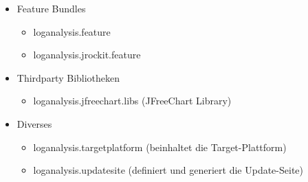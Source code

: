 \begin{itemize}
	\item Feature Bundles
		\begin{itemize}
			\item loganalysis.feature
			\item loganalysis.jrockit.feature
		\end{itemize}
	\item Thirdparty Bibliotheken
		\begin{itemize}
			\item  loganalysis.jfreechart.libs (JFreeChart Library)
		\end{itemize}
	\item Diverses
		\begin{itemize}
			\item  loganalysis.targetplatform (beinhaltet die Target-Plattform)
			\item loganalysis.updatesite (definiert und generiert die Update-Seite)
		\end{itemize}
\end{itemize}




